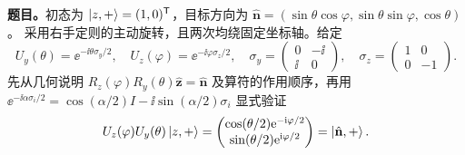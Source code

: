 \textbf{题目。}初态为 $\left|z,+\right\rangle=(1,0)^{\mathsf T}$，目标方向为
$\hat{\mathbf n}=(\sin\theta\cos\varphi,\sin\theta\sin\varphi,\cos\theta)$。
采用右手定则的主动旋转，且两次均绕固定坐标轴。给定
\begin{equation}
  U_y(\theta)=\ee^{-\ii\theta\sigma_y/2},\quad
  U_z(\varphi)=\ee^{-\ii\varphi\sigma_z/2},\quad
  \sigma_y=\begin{pmatrix}0&-\ii\\\ii&0\end{pmatrix},\quad
  \sigma_z=\begin{pmatrix}1&0\\0&-1\end{pmatrix}.
\end{equation}
先从几何说明 $R_z(\varphi)R_y(\theta)\hat{\mathbf z}=\hat{\mathbf n}$ 及算符的作用顺序，再用 $\ee^{-\ii\alpha\sigma_i/2}=\cos(\alpha/2)I-\ii\sin(\alpha/2)\sigma_i$ 显式验证
\begin{equation}
  U_z(\varphi)U_y(\theta)\left|z,+\right\rangle
    =\begin{pmatrix}\cos(\theta/2)\mathrm{e}^{-\mathrm{i}\varphi/2}\\
      \sin(\theta/2)\mathrm{e}^{\mathrm{i}\varphi/2}\end{pmatrix}
    =\left|\hat{\mathbf n},+\right\rangle.
\end{equation}

